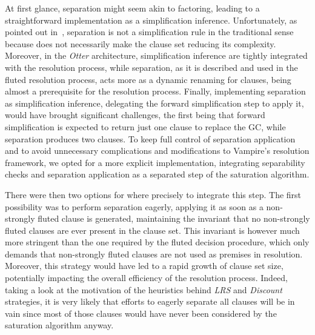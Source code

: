 At first glance, separation might seem akin to factoring, leading to a straightforward implementation as a simplification inference.
Unfortunately, as pointed out in~\cite{hustadt2000resolution}, separation is not a simplification rule in the traditional sense because does not necessarily make the clause set  reducing its complexity.
Moreover, in the \emph{Otter} architecture, simplification inference are tightly integrated with the resolution process, while separation, as it is described and used in the fluted resolution process, acts more as a dynamic renaming for clauses, being almost a prerequisite for the resolution process.
Finally, implementing separation as simplification inference, delegating the forward simplification step to apply it, would have brought significant challenges, the first being that forward simplification is expected to return just one clause to replace the GC, while separation produces two clauses.
To keep full control of separation application and to avoid unnecessary complications and modifications to Vampire's resolution framework, we opted for a more explicit implementation, integrating separability checks and separation application as a separated step of the saturation algorithm.

There were then two options for where precisely to integrate this step.
The first possibility was to perform separation eagerly, applying it as soon as a non-strongly fluted clause is generated, maintaining the invariant that no non-strongly fluted clauses are ever present in the clause set.
This invariant is however much more stringent than the one required by the fluted decision procedure, which only demands that non-strongly fluted clauses are not used as premises in resolution.
Moreover, this strategy would have led to a rapid growth of clause set size, potentially impacting the overall efficiency of the resolution process.
Indeed, taking a look at the motivation of the heuristics behind \emph{LRS} and \emph{Discount} strategies, it is very likely that efforts to eagerly separate all clauses will be in vain since most of those clauses would have never been considered by the saturation algorithm anyway.

